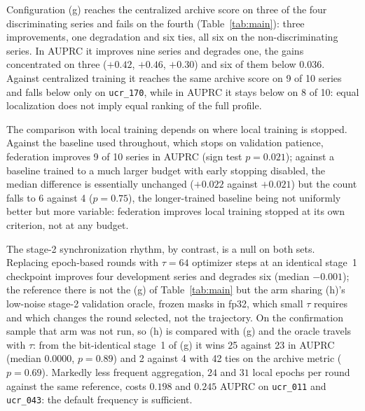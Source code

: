 \documentclass[conference]{IEEEtran}
\begin{document}
Configuration (g) reaches the centralized archive score on three of the four discriminating series
and fails on the fourth (Table~\ref{tab:main}): three improvements, one degradation and six ties, all
six on the non-discriminating series. In AUPRC it improves nine series and degrades one, the gains
concentrated on three ($+0.42$, $+0.46$, $+0.30$) and six of them below $0.036$. Against centralized
training it reaches the same archive score on 9 of 10 series and falls below only on
\texttt{ucr\_170}, while in AUPRC it stays below on 8 of 10: equal localization does not imply equal
ranking of the full profile.

The comparison with local training depends on where local training is stopped. Against the baseline
used throughout, which stops on validation patience, federation improves 9 of 10 series in AUPRC
(sign test $p=0.021$); against a baseline trained to a much larger budget with early
stopping disabled, the median difference is essentially unchanged ($+0.022$ against $+0.021$) but
the count falls to 6 against 4
($p=0.75$), the longer-trained baseline being not uniformly better but more variable: federation
improves local training stopped at its own criterion, not at any budget.

The stage-2 synchronization rhythm, by contrast, is a null on both sets. Replacing epoch-based
rounds with $\tau=64$ optimizer steps at an identical stage~1 checkpoint improves four development
series and degrades six (median $-0.001$); the reference there is not the (g) of
Table~\ref{tab:main} but the arm sharing (h)'s low-noise stage-2 validation oracle, frozen masks in
fp32, which small $\tau$ requires and which changes the round selected, not the trajectory. On the
confirmation sample that arm was not run, so (h) is compared with (g) and the oracle travels with
$\tau$: from the bit-identical stage~1 of (g) it wins 25 against 23 in AUPRC (median $0.0000$,
$p=0.89$) and 2 against 4 with 42 ties on the archive metric ($p=0.69$). Markedly less frequent
aggregation, $24$ and $31$ local epochs per round against the same reference, costs $0.198$ and
$0.245$ AUPRC on \texttt{ucr\_011} and \texttt{ucr\_043}: the default frequency is sufficient.
\end{document}
